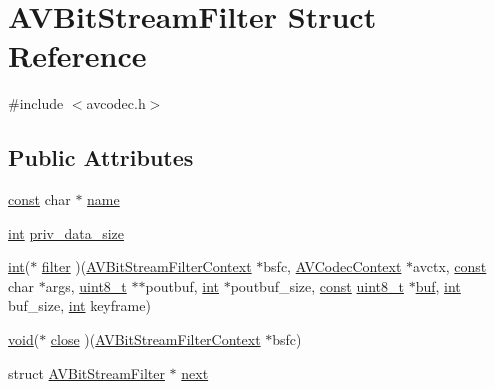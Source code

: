 \hypertarget{struct_a_v_bit_stream_filter}{}\section{A\+V\+Bit\+Stream\+Filter Struct Reference}
\label{struct_a_v_bit_stream_filter}


{\ttfamily \#include $<$avcodec.\+h$>$}

\subsection*{Public Attributes}
\begin{DoxyCompactItemize}
\item 
\hyperlink{getopt1_8c_a2c212835823e3c54a8ab6d95c652660e}{const} char $\ast$ \hyperlink{struct_a_v_bit_stream_filter_a33c3cb51bd13060da35481655b41e4e5}{name}
\item 
\hyperlink{xmltok_8h_a5a0d4a5641ce434f1d23533f2b2e6653}{int} \hyperlink{struct_a_v_bit_stream_filter_abf78eca41afed22f479532dbfb2f8ec6}{priv\+\_\+data\+\_\+size}
\item 
\hyperlink{xmltok_8h_a5a0d4a5641ce434f1d23533f2b2e6653}{int}($\ast$ \hyperlink{struct_a_v_bit_stream_filter_a2f63b65bba916ee884a35cff42636882}{filter} )(\hyperlink{struct_a_v_bit_stream_filter_context}{A\+V\+Bit\+Stream\+Filter\+Context} $\ast$bsfc, \hyperlink{struct_a_v_codec_context}{A\+V\+Codec\+Context} $\ast$avctx, \hyperlink{getopt1_8c_a2c212835823e3c54a8ab6d95c652660e}{const} char $\ast$args, \hyperlink{lib-src_2ffmpeg_2win32_2stdint_8h_a9a941819355e6f658991890ff66b4b0e}{uint8\+\_\+t} $\ast$$\ast$poutbuf, \hyperlink{xmltok_8h_a5a0d4a5641ce434f1d23533f2b2e6653}{int} $\ast$poutbuf\+\_\+size, \hyperlink{getopt1_8c_a2c212835823e3c54a8ab6d95c652660e}{const} \hyperlink{lib-src_2ffmpeg_2win32_2stdint_8h_a9a941819355e6f658991890ff66b4b0e}{uint8\+\_\+t} $\ast$\hyperlink{xlstr_8c_a781718f5b53a876fe91c424c4607fa8f}{buf}, \hyperlink{xmltok_8h_a5a0d4a5641ce434f1d23533f2b2e6653}{int} buf\+\_\+size, \hyperlink{xmltok_8h_a5a0d4a5641ce434f1d23533f2b2e6653}{int} keyframe)
\item 
\hyperlink{sound_8c_ae35f5844602719cf66324f4de2a658b3}{void}($\ast$ \hyperlink{struct_a_v_bit_stream_filter_a7f5d4dcbfd472a3fa73f1bb13a41c491}{close} )(\hyperlink{struct_a_v_bit_stream_filter_context}{A\+V\+Bit\+Stream\+Filter\+Context} $\ast$bsfc)
\item 
struct \hyperlink{struct_a_v_bit_stream_filter}{A\+V\+Bit\+Stream\+Filter} $\ast$ \hyperlink{struct_a_v_bit_stream_filter_a4bdb343a6dc2a6031a8fed27bc60d022}{next}
\end{DoxyCompactItemize}


